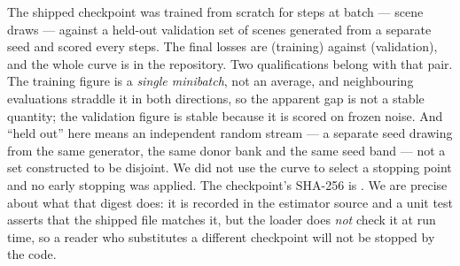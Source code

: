 \documentclass[review]{elsarticle}
\begin{document}
The shipped checkpoint was trained from scratch for \TrainSteps{} steps at batch
\TrainBatch{} --- \TrainScenes{} scene draws --- against a held-out validation set of
\TrainValScenes{} scenes generated from a separate seed and scored every
\TrainValEvery{} steps. The final losses are \TrainLossFinal{} (training) against
\TrainValLossFinal{} (validation), and the whole curve is in the repository. Two
qualifications belong with that pair. The training figure is a \emph{single
minibatch}, not an average, and neighbouring evaluations straddle it in both
directions, so the apparent gap is not a stable quantity; the validation figure is
stable because it is scored on frozen noise. And ``held out'' here means an
independent random stream --- a separate seed drawing from the same generator, the
same donor bank and the same seed band --- not a set constructed to be disjoint. We
did not use the curve to select a stopping point and no early stopping was applied.
The checkpoint's SHA-256 is \texttt{\CkptShaFull{}}. We are precise about
what that digest does: it is recorded in the estimator source and a unit test asserts
that the shipped file matches it, but the loader does \emph{not} check it at run
time, so a reader who substitutes a different checkpoint will not be stopped by the
code.
\end{document}
